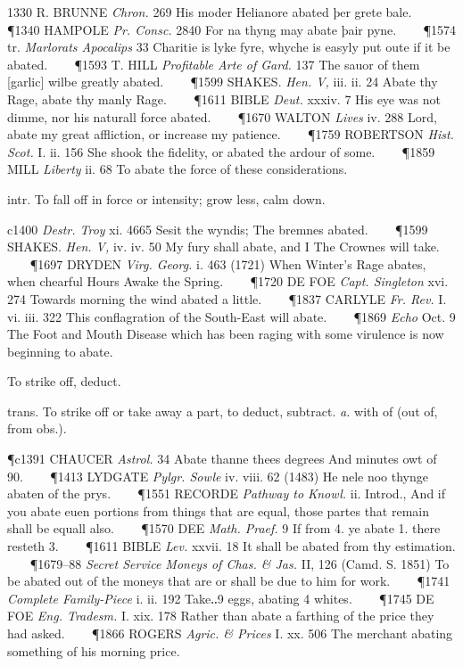 \begin{description}[wide, labelwidth=!, labelindent=0pt]
\begin{myenumerate}
1330 R. BRUNNE \textit{Chron.} 269 His moder Helianore abated þer grete bale.    
\P 1340 HAMPOLE \textit{Pr. Consc.} 2840 For na thyng may abate þair pyne.    
\P 1574 tr. \textit{Marlorats Apocalips} 33 Charitie is lyke fyre, whyche is 
easyly put oute if it be abated.    
\P 1593 T. HILL \textit{Profitable Arte of Gard.} 137 The sauor of them 
[garlic] wilbe greatly abated.    
\P 1599 SHAKES. \textit{Hen. V,} iii. ii. 24 Abate thy Rage, abate thy manly 
Rage.    
\P 1611 BIBLE \textit{Deut.} xxxiv. 7 His eye was not dimme, nor his naturall 
force abated.    
\P 1670 WALTON \textit{Lives} iv. 288 Lord, abate my great affliction, or 
increase my patience.    
\P 1759 ROBERTSON \textit{Hist. Scot.} I. ii. 156 She shook the fidelity, or 
abated the ardour of some.    
\P 1859 MILL \textit{Liberty} ii. 68 To abate the force of these considerations.

 intr. To fall off in force or intensity; grow less, calm down. 

c1400 \textit{Destr. Troy} xi. 4665 Sesit the wyndis; The bremnes abated.    
\P 1599 SHAKES. \textit{Hen. V,} iv. iv. 50 My fury shall abate, and I The 
Crownes will take.    
\P 1697 DRYDEN \textit{Virg. Georg.} i. 463 (1721) When Winter's Rage abates, 
when chearful Hours Awake the Spring.    
\P 1720 DE FOE \textit{Capt. Singleton} xvi. 274 Towards morning the wind 
abated a little.    
\P 1837 CARLYLE \textit{Fr. Rev.} I. vi. iii. 322 This conflagration of the 
South-East will abate.    
\P 1869 \textit{Echo} Oct. 9 The Foot and Mouth Disease which has been raging 
with some virulence is now beginning to abate.

 To strike off, deduct. 

 trans. To strike off or take away a part, to deduct, subtract. 
\textit{a.} with of (out of, from obs.). 

\P c1391 CHAUCER \textit{Astrol.} 34 Abate thanne thees degrees And minutes 
owt of 90.    
\P 1413 LYDGATE \textit{Pylgr. Sowle} iv. viii. 62 (1483) He nele noo thynge 
abaten of the prys.    
\P 1551 RECORDE \textit{Pathway to Knowl.} ii. Introd., And if you abate euen 
portions from things that are equal, those partes that remain shall be equall 
also.    
\P 1570 DEE \textit{Math. Praef.} 9 If from 4. ye abate 1. there resteth 3.    
\P 1611 BIBLE \textit{Lev.} xxvii. 18 It shall be abated from thy estimation.    
\P 1679–88 \textit{Secret Service Moneys of Chas. \& Jas.} II, 126 (Camd. S. 
1851) To be abated out of the moneys that are or shall be due to him for work.    
\P 1741 \textit{Complete Family-Piece} i. ii. 192 Take‥9 eggs, abating 4 whites.    
\P 1745 DE FOE \textit{Eng. Tradesm.} I. xix. 178 Rather than abate a farthing 
of the price they had asked.    
\P 1866 ROGERS \textit{Agric. \& Prices} I. xx. 506 The merchant abating 
something of his morning price.


\end{myenumerate}
\end{description}
